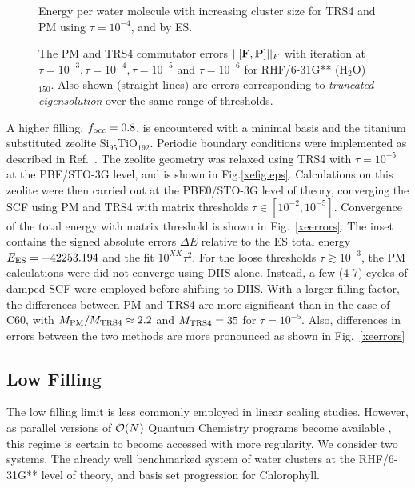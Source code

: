 \commentoutA{\documentclass[prb,aps,twocolumn,twocolumngrid,secnumarabic]{revtex4}}
\begin{document}
\begin{figure}[tb]
\caption{Energy per water molecule with increasing cluster size for TRS4 and PM 
         using $\tau=10^{-4}$, and by ES.}\label{waterenergyerrors}
\end{figure}

\begin{figure}[tb]
\caption{The PM and TRS4 commutator errors $||[{\bf F ,P }]||_F$ with iteration
         at $\tau=10^{-3}, \tau=10^{-4}, \tau=10^{-5}$ and $\tau=10^{-6}$ for  
         RHF/6-31G** (H$_2$O)$_{150}$. Also shown (straight lines) are errors 
         corresponding to {\em truncated eigensolution} over the same 
         range of thresholds.}\label{commerrors}
\end{figure}


A higher filling, $f_{\rm occ}=0.8$, is encountered with a minimal basis and the titanium substituted zeolite 
Si$_{95}$TiO$_{192}$.  Periodic boundary conditions were implemented as described in Ref.~.    
The zeolite geometry was relaxed using TRS4 with $\tau = 10^{-5}$ at the PBE/STO-3G level, and is shown
in Fig.\ref{xefig.eps}. Calculations on this zeolite were then carried out at the PBE0/STO-3G level of theory,  
converging the SCF using PM and TRS4 with matrix thresholds $\tau \in [10^{-2},10^{-5}]$.  
Convergence of the total energy with matrix threshold is shown in Fig.~\ref{xeerrors}.  The inset contains 
the signed absolute errors $\Delta E$ relative to the ES total energy $E_{\rm ES}=-42253.194$ 
and the fit $10^{XX} \tau^2$.  For the loose thresholds $\tau \gtrsim 10^{-3}$, the PM calculations were
did not converge using DIIS alone.  Instead, a few (4-7) cycles of damped SCF were employed before
shifting to DIIS.  With a larger filling factor, the differences between PM and TRS4 are more significant than 
in the case of C60, with $M_{\rm PM}/M_{\rm TRS4} \approx 2.2$ and $M_{\rm TRS4}=35$ for $\tau=10^{-5}$.  
Also, differences in errors between the two methods are more pronounced as shown in Fig.~\ref{xeerrors}

\subsection{Low Filling}

The low filling limit is less commonly employed in linear scaling studies.  However, as parallel versions
of ${\cal O}(N)$ Quantum Chemistry programs become available \cite{MChallacombe00B,CKGan03}, this regime 
is certain to become accessed with more regularity.  We consider two systems.  The already well benchmarked 
system of water clusters at the RHF/6-31G** level of theory, and basis set progression for Chlorophyll.
\end{document}
